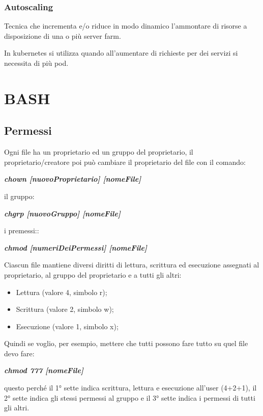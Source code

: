 \subsubsection{Autoscaling}\label{autoscaling}

Tecnica che incrementa e/o riduce in modo dinamico l'ammontare di
risorse a disposizione di una o più server farm.

In kubernetes si utilizza quando all'aumentare di richieste per dei
servizi si necessita di più pod.

\section{BASH}\label{bash}

\subsection{Permessi}\label{permessi}

Ogni file ha un proprietario ed un gruppo del proprietario, il
proprietario/creatore poi può cambiare il proprietario del file con il
comando:

\emph{\textbf{chown {[}nuovoProprietario{]} {[}nomeFile{]}}}

il gruppo:

\emph{\textbf{chgrp {[}nuovoGruppo{]} {[}nomeFile{]}}}

i premessi::

\emph{\textbf{chmod {[}numeriDeiPermessi{]} {[}nomeFile{]}}}

Ciascun file mantiene diversi diritti di lettura, scrittura ed
esecuzione assegnati al proprietario, al gruppo del proprietario e a
tutti gli altri:

\begin{itemize}
\item
  Lettura (valore 4, simbolo r);
\item
  Scrittura (valore 2, simbolo w);
\item
  Esecuzione (valore 1, simbolo x);
\end{itemize}

Quindi se voglio, per esempio, mettere che tutti possono fare tutto su
quel file devo fare:

\emph{\textbf{chmod 777 {[}nomeFile{]}}}

questo perché il 1° sette indica scrittura, lettura e esecuzione
all'user (4+2+1), il 2° sette indica gli stessi permessi al gruppo e il
3° sette indica i permessi di tutti gli altri.

